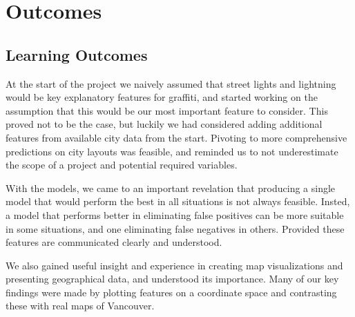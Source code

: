 \chapter{Outcomes}

\section{Learning Outcomes} %
At the start of the project we naively assumed that street lights and lightning would be key explanatory features for graffiti, and started working on the assumption that this would be our most important feature to consider. This proved not to be the case, but luckily we had considered adding additional features from available city data from the start. Pivoting to more comprehensive predictions on city layouts was feasible, and reminded us to not underestimate the scope of a project and potential required variables.

With the models, we came to an important revelation that producing a single model that would perform the best in all situations is not always feasible. Insted, a model that performs better in eliminating false positives can be more suitable in some situations, and one eliminating false negatives in others. Provided these features are communicated clearly and understood. 

We also gained useful insight and experience in creating map visualizations and presenting geographical data, and understood its importance. Many of our key findings were made by plotting features on a coordinate space and contrasting these with real maps of Vancouver.

%

